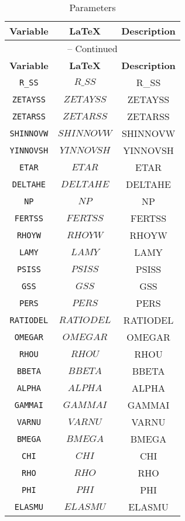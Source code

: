 \begin{center}
\begin{longtable}{ccc}
\caption{Parameters}\\%
\hline%
\multicolumn{1}{c}{\textbf{Variable}} &
\multicolumn{1}{c}{\textbf{\LaTeX}} &
\multicolumn{1}{c}{\textbf{Description}}\\%
\hline\hline%
\endfirsthead
\multicolumn{3}{c}{{\tablename} \thetable{} -- Continued}\\%
\hline%
\multicolumn{1}{c}{\textbf{Variable}} &
\multicolumn{1}{c}{\textbf{\LaTeX}} &
\multicolumn{1}{c}{\textbf{Description}}\\%
\hline\hline%
\endhead
\texttt{R\_SS} & $R\_SS$ & R\_SS\\
\texttt{ZETAYSS} & $ZETAYSS$ & ZETAYSS\\
\texttt{ZETARSS} & $ZETARSS$ & ZETARSS\\
\texttt{SHINNOVW} & $SHINNOVW$ & SHINNOVW\\
\texttt{YINNOVSH} & $YINNOVSH$ & YINNOVSH\\
\texttt{ETAR} & $ETAR$ & ETAR\\
\texttt{DELTAHE} & $DELTAHE$ & DELTAHE\\
\texttt{NP} & $NP$ & NP\\
\texttt{FERTSS} & $FERTSS$ & FERTSS\\
\texttt{RHOYW} & $RHOYW$ & RHOYW\\
\texttt{LAMY} & $LAMY$ & LAMY\\
\texttt{PSISS} & $PSISS$ & PSISS\\
\texttt{GSS} & $GSS$ & GSS\\
\texttt{PERS} & $PERS$ & PERS\\
\texttt{RATIODEL} & $RATIODEL$ & RATIODEL\\
\texttt{OMEGAR} & $OMEGAR$ & OMEGAR\\
\texttt{RHOU} & $RHOU$ & RHOU\\
\texttt{BBETA} & $BBETA$ & BBETA\\
\texttt{ALPHA} & $ALPHA$ & ALPHA\\
\texttt{GAMMAI} & $GAMMAI$ & GAMMAI\\
\texttt{VARNU} & $VARNU$ & VARNU\\
\texttt{BMEGA} & $BMEGA$ & BMEGA\\
\texttt{CHI} & $CHI$ & CHI\\
\texttt{RHO} & $RHO$ & RHO\\
\texttt{PHI} & $PHI$ & PHI\\
\texttt{ELASMU} & $ELASMU$ & ELASMU\\

\end{longtable}
\end{center}
